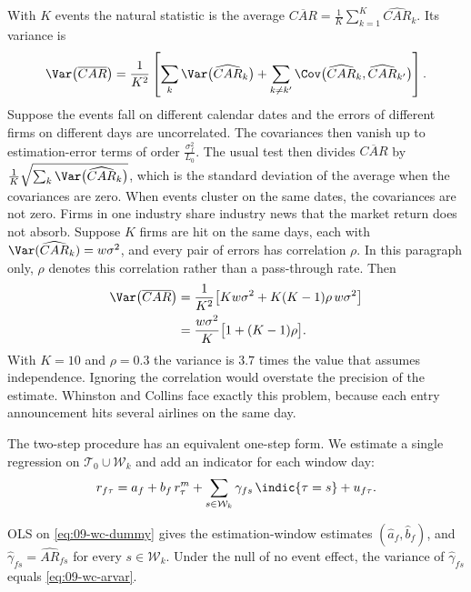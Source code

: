 With $K$ events the natural statistic is the average
$\overline{CAR}=\frac{1}{K}\sum_{k=1}^{K}\widehat{CAR}_k$. Its variance is
\begin{equation*}
\Var\big(\overline{CAR}\big)=\frac{1}{K^2}\left[\sum_{k}\Var\big(\widehat{CAR}_k\big)
 +\sum_{k\neq k'}\Cov\big(\widehat{CAR}_k,\widehat{CAR}_{k'}\big)\right].
\end{equation*}
Suppose the events fall on different calendar dates and the errors of different firms on different days
are uncorrelated. The covariances then vanish up to estimation-error terms of order
$\frac{\sigma_f^2}{L_0}$. The usual test then divides $\overline{CAR}$ by
$\frac{1}{K}\sqrt{\sum_{k}\Var\big(\widehat{CAR}_k\big)}$, which is the standard deviation of the average
when the covariances are zero.
When events cluster on the same dates, the covariances are not zero. Firms in one industry share
industry news that the market return does not absorb. Suppose $K$ firms are hit on the same days, each
with $\Var(\widehat{CAR}_k)=w\sigma^2$, and every pair of errors has correlation $\rho$. In this
paragraph only, $\rho$ denotes this correlation rather than a pass-through rate. Then
\begin{align*}
\Var\big(\overline{CAR}\big) &= \frac{1}{K^2}\big[K w\sigma^2+K(K-1)\rho\, w\sigma^2\big]\\
 &= \frac{w\sigma^2}{K}\big[1+(K-1)\rho\big].
\end{align*}
With $K=10$ and $\rho=0.3$ the variance is $3.7$ times the value that assumes independence. Ignoring
the correlation would overstate the precision of the estimate. Whinston and Collins face exactly this
problem, because each entry announcement hits several airlines on the same day.

The two-step procedure has an equivalent one-step form. We estimate a single regression on
$\mathcal{T}_0\cup\mathcal{W}_k$ and add an indicator for each window day:
\begin{equation}\label{eq:09-wc-dummy}
r_{f\tau}=a_f+b_f\,r^m_\tau+\sum_{s\in\mathcal{W}_k}\gamma_{fs}\,\indic\{\tau=s\}+u_{f\tau}.
\end{equation}

\begin{proposition}\label{prop:09-wc-dummy}
OLS on \eqref{eq:09-wc-dummy} gives the estimation-window estimates $(\hat a_f,\hat b_f)$, and
$\hat\gamma_{fs}=\widehat{AR}_{fs}$ for every $s\in\mathcal{W}_k$. Under the null of no event effect,
the variance of $\hat\gamma_{fs}$ equals \eqref{eq:09-wc-arvar}.
\end{proposition}

